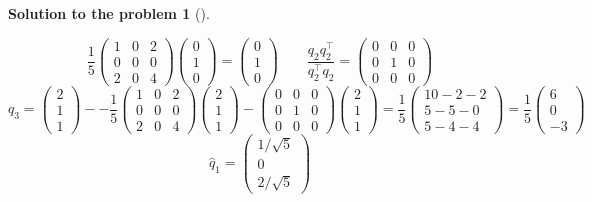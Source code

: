 \documentclass[12pt,a4]{article}
\newtheorem{solution}{Solution to the problem}
\begin{document}
\begin{solution}[]
\begin{enumerate}[(a)]
\[\frac{1}{5}
\begin{pmatrix} 1 & 0 & 2 \\ 0 & 0 & 0 \\ 2 & 0 & 4 \end{pmatrix}
\begin{pmatrix} 0 \\ 1 \\ 0  \end{pmatrix}
=
\begin{pmatrix} 0 \\ 1 \\ 0  \end{pmatrix}
\qquad
\frac{q_2 q_2^\top}{q_2^\top q_2} =
\begin{pmatrix} 0 & 0 & 0 \\ 0 & 1 & 0 \\ 0 & 0 & 0 \end{pmatrix}
\]
\[
q_3 = \begin{pmatrix} 2 \\ 1 \\ 1  \end{pmatrix} -
-
\frac{1}{5}
\begin{pmatrix} 1 & 0 & 2 \\ 0 & 0 & 0 \\ 2 & 0 & 4 \end{pmatrix}
\begin{pmatrix} 2 \\ 1 \\ 1  \end{pmatrix}
-
\begin{pmatrix} 0 & 0 & 0 \\ 0 & 1 & 0 \\ 0 & 0 & 0 \end{pmatrix}
\begin{pmatrix} 2 \\ 1 \\ 1  \end{pmatrix}
=
\frac{1}{5}
\begin{pmatrix} 10 - 2 - 2 \\ 5 - 5 - 0 \\ 5 - 4 - 4 \end{pmatrix}
=
\frac{1}{5}
\begin{pmatrix} 6 \\ 0 \\ -3 \end{pmatrix}
\]
\[
\hat q_1 =
\begin{pmatrix} 1/\sqrt 5 \\ 0 \\ 2/\sqrt 5  \end{pmatrix}
\]
\end{enumerate}
\end{solution}
\end{document}

